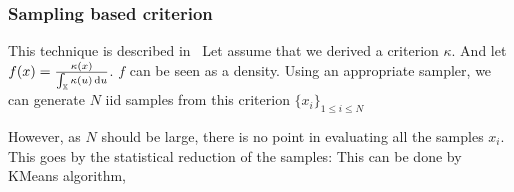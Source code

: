 \documentclass[../../Main_ManuscritThese.tex]{subfiles}
\begin{document}




\subsubsection{Sampling based criterion}
\label{sec:sampling_based_criterion}
This technique is described in~\cite{dubourg_reliability-based_2011}
Let assume that we derived a criterion $\kappa$. And let $f(x) = \frac{\kappa(x)}{\int_{\mathbb{X}}\kappa(u)\,\mathrm{d}u}$. $f$ can be seen as a density.
  Using an appropriate sampler, we can generate $N$ iid samples from this criterion $\{x_i\}_{1\leq i \leq N}$
  
  However, as $N$ should be large, there is no point in evaluating all the samples $x_i$. This goes by the statistical reduction of the samples:
  This can be done by KMeans algorithm, 



  
\end{document}
